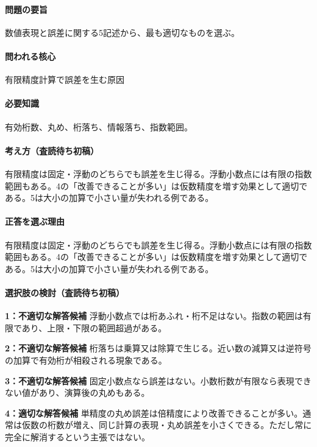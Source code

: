 \paragraph{問題の要旨} 数値表現と誤差に関する5記述から、最も適切なものを選ぶ。

\paragraph{問われる核心} 有限精度計算で誤差を生む原因

\paragraph{必要知識} 有効桁数、丸め、桁落ち、情報落ち、指数範囲。

\paragraph{考え方（査読待ち初稿）} 有限精度は固定・浮動のどちらでも誤差を生じ得る。浮動小数点には有限の指数範囲もある。4の「改善できることが多い」は仮数精度を増す効果として適切である。5は大小の加算で小さい量が失われる例である。

\paragraph{正答を選ぶ理由} 有限精度は固定・浮動のどちらでも誤差を生じ得る。浮動小数点には有限の指数範囲もある。4の「改善できることが多い」は仮数精度を増す効果として適切である。5は大小の加算で小さい量が失われる例である。

\paragraph{選択肢の検討（査読待ち初稿）}\mbox{}\par

\noindent\textbf{1：不適切な解答候補} 浮動小数点では桁あふれ・桁不足はない。指数の範囲は有限であり、上限・下限の範囲超過がある。\par

\noindent\textbf{2：不適切な解答候補} 桁落ちは乗算又は除算で生じる。近い数の減算又は逆符号の加算で有効桁が相殺される現象である。\par

\noindent\textbf{3：不適切な解答候補} 固定小数点なら誤差はない。小数桁数が有限なら表現できない値があり、演算後の丸めもある。\par

\noindent\textbf{4：適切な解答候補} 単精度の丸め誤差は倍精度により改善できることが多い。通常は仮数の桁数が増え、同じ計算の表現・丸め誤差を小さくできる。ただし常に完全に解消するという主張ではない。\par

